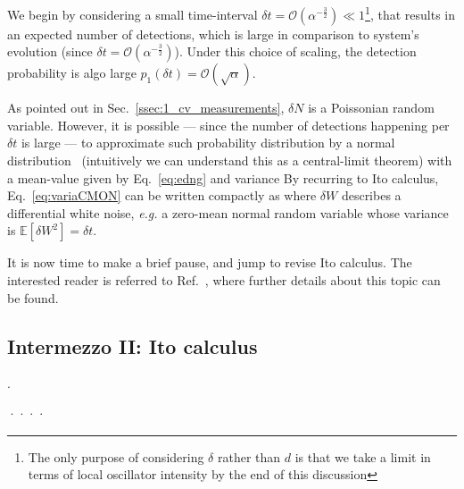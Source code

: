We begin by considering a small time-interval $\delta t = \mathcal{O}(\alpha^{-\frac{3}{2}})\ll1$\footnote{The only purpose of considering $\delta$ rather than $d$ is that we take a limit in terms of local oscillator intensity by the end of this discussion}, that results in an expected number of detections,
which is large in comparison to system's evolution (since $\delta t = \mathcal{O}(\alpha^{-\frac{3}{2}})$). Under this choice of scaling, the detection probability is algo large $p_1(\delta t) = \mathcal{O}(\sqrt{\alpha})$.

As pointed out in Sec.~\ref{ssec:1_cv_measurements}, $\delta N$ is a Poissonian random variable. However, it is possible --- since the number of detections happening per $\delta t$ is large --- to approximate such probability distribution by a normal distribution~\cite{wisemanbook,wiseman1993quantum} (intuitively we can understand this as a central-limit theorem) with a mean-value given by Eq.~\ref{eq:edng} and variance
By recurring to Ito calculus, Eq.~\eqref{eq:variaCMON} can be written compactly as
where $\delta W$ describes a differential white noise, \textit{e.g.} a zero-mean normal random variable whose variance is $\mathbb{E}[\delta W^2] = \delta t $.

It is now time to make a brief pause, and jump to revise Ito calculus. The interested reader is referred to Ref.~\cite{gardiner2004handbook}, where further details about this topic can be found.

\subsection{Intermezzo II: Ito calculus}\label{ssec:ito}

\jcc{}

.




····


